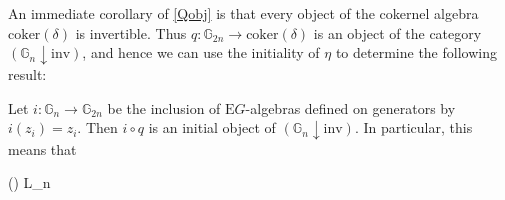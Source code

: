 An immediate corollary of \cref{Qobj} is that every object of the cokernel algebra $\mathrm{coker}(\delta)$ is invertible. Thus $q: \mathbb{G}_{2n} \to \mathrm{coker}(\delta)$ is an object of the category $(\mathbb{G}_n \downarrow \mathrm{inv})$, and hence we can use the initiality of $\eta$ to determine the following result:

\begin{prop}\label{coker} Let $i: \mathbb{G}_n \to \mathbb{G}_{2n}$ be the inclusion of $\mathrm{E}G$-algebras defined on generators by $i(z_i) = z_i$. Then $i \circ q$ is an initial object of $(\mathbb{G}_n \downarrow \mathrm{inv})$. In particular, this means that
\begin{eq*} (\delta) \quad \cong \quad L_n \end{eq*}
\end{prop}
